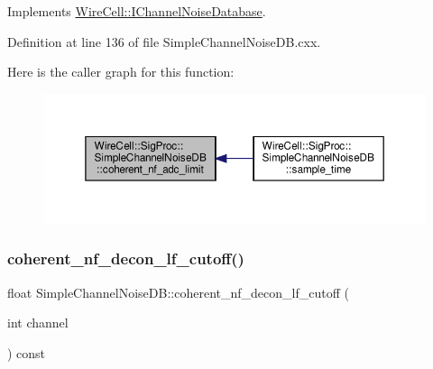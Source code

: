 Implements \hyperlink{class_wire_cell_1_1_i_channel_noise_database_ac75b3b6b0c7368c0c87d907012abaf9d}{Wire\+Cell\+::\+I\+Channel\+Noise\+Database}.



Definition at line 136 of file Simple\+Channel\+Noise\+D\+B.\+cxx.

Here is the caller graph for this function\+:
\nopagebreak
\begin{figure}[H]
\begin{center}
\leavevmode
\includegraphics[width=350pt]{class_wire_cell_1_1_sig_proc_1_1_simple_channel_noise_d_b_a5c9dfedd62780fe11dafaa0739876803_icgraph}
\end{center}
\end{figure}
\mbox{\label{class_wire_cell_1_1_sig_proc_1_1_simple_channel_noise_d_b_a52def69ce297e7fc097b91a4472cbc25}} 
\subsubsection{\texorpdfstring{coherent\+\_\+nf\+\_\+decon\+\_\+lf\+\_\+cutoff()}{coherent\_nf\_decon\_lf\_cutoff()}}
{\footnotesize\ttfamily float Simple\+Channel\+Noise\+D\+B\+::coherent\+\_\+nf\+\_\+decon\+\_\+lf\+\_\+cutoff (\begin{DoxyParamCaption}\item[{int}]{channel }\end{DoxyParamCaption}) const\hspace{0.3cm}{\ttfamily [virtual]}}



